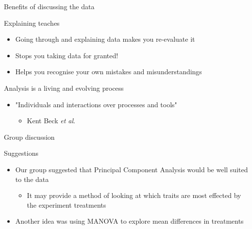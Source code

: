 \documentclass[t, aspectratio=169]{beamer}
\begin{document}
\begin{frame}[label={sec:orgf8ec4f8}]{Benefits of discussing the data}
\begin{block}{Explaining teaches}
\begin{itemize}
\item Going through and explaining data makes you re-evaluate it
\item Stops you taking data for granted!
\item Helps you recognise your own mistakes and misunderstandings
\end{itemize}
\end{block}


\begin{block}{Analysis is a living and evolving process}
\begin{itemize}
\item "Individuals and interactions over processes and tools"
\begin{itemize}
\item Kent Beck \emph{et al}.
\end{itemize}
\end{itemize}
\end{block}
\end{frame}
\begin{frame}[label={sec:org585d81b}]{Group discussion}
\begin{block}{Suggestions}
\begin{itemize}
\item Our group suggested that Principal Component Analysis would be well suited to the data
\begin{itemize}
\item It may provide a method of looking at which traits are most effected by the experiment treatments
\end{itemize}
\item Another idea was using MANOVA to explore mean differences in treatments
\end{itemize}
\end{block}
\end{frame}
\end{document}
